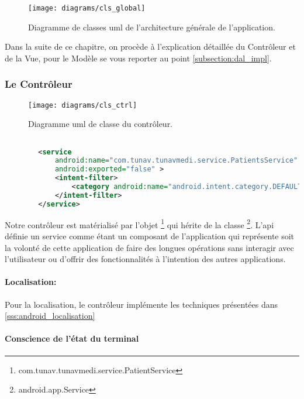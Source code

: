 \begin{figure}
\center
\texttt{[image: diagrams/cls\_global]}
\caption{Diagramme de classes \gls{uml} de l'architecture générale de l'application.}
\label{fig:cls_global}
\end{figure}

Dans la suite de ce chapitre, on procède à l'explication détaillée du Contrôleur
et de la Vue, pour le Modèle se vous reporter au point
\ref{subsection:dal_impl}.

\subsubsection{Le Contrôleur}

\begin{figure}
\center
\texttt{[image: diagrams/cls\_ctrl]}
\caption{Diagramme \gls{uml} de classe du contrôleur.}
\label{fig:cls_ctrl}
\end{figure}

\begin{lstlisting}[language=xml, caption=Déclaration dans AndroidManifest du PatientService]

        <service
            android:name="com.tunav.tunavmedi.service.PatientsService"
            android:exported="false" >
            <intent-filter>
                <category android:name="android.intent.category.DEFAULT" />
            </intent-filter>
        </service>

\end{lstlisting}

Notre contrôleur est matérialisé par l'objet
\footnote{com.tunav.tunavmedi.service.PatientService} qui
hérite de la classe \footnote{android.app.Service}. L'\gls{api}
\android{} définie un service comme étant un composant de l'application qui
représente soit la volonté de cette application de faire des longues opérations
sans interagir avec l'utilisateur ou d’offrir des fonctionnalités à
l'intention des autres applications\cite{api:service}.

\paragraph{Localisation:}
Pour la localisation, le contrôleur implémente les techniques présentées dans \ref{sss:android_localisation}

\paragraph{Conscience de l'état du terminal}

